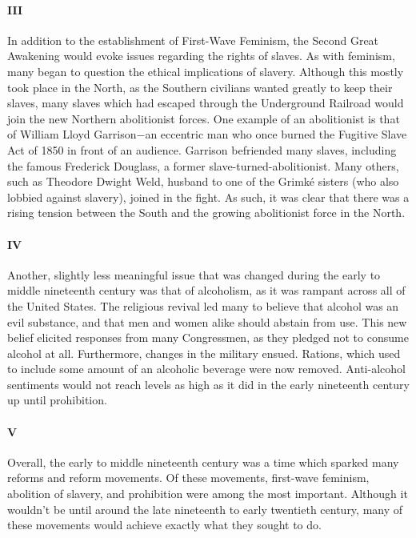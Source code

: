 \documentclass[12pt]{article}
\begin{document}
    \paragraph{III} In addition to the establishment of First-Wave Feminism, the Second Great Awakening would evoke issues regarding the rights of slaves. As with feminism, many began to question the ethical implications of slavery. Although this mostly took place in the North, as the Southern civilians wanted greatly to keep their slaves, many slaves which had escaped through the Underground Railroad would join the new Northern abolitionist forces. One example of an abolitionist is that of William Lloyd Garrison$-$an eccentric man who once burned the Fugitive Slave Act of 1850 in front of an audience. Garrison befriended many slaves, including the famous Frederick Douglass, a former slave-turned-abolitionist. Many others, such as Theodore Dwight Weld, husband to one of the Grimk\'e sisters (who also lobbied against slavery), joined in the fight. As such, it was clear that there was a rising tension between the South and the growing abolitionist force in the North.

    \paragraph{IV} Another, slightly less meaningful issue that was changed during the early to middle nineteenth century was that of alcoholism, as it was rampant across all of the United States. The religious revival led many to believe that alcohol was an evil substance, and that men and women alike should abstain from use. This new belief elicited responses from many Congressmen, as they pledged not to consume alcohol at all. Furthermore, changes in the military ensued. Rations, which used to include some amount of an alcoholic beverage were now removed. Anti-alcohol sentiments would not reach levels as high as it did in the early nineteenth century up until prohibition.

    \paragraph{V} Overall, the early to middle nineteenth century was a time which sparked many reforms and reform movements. Of these movements, first-wave feminism, abolition of slavery, and prohibition were among the most important. Although it wouldn't be until around the late nineteenth to early twentieth century, many of these movements would achieve exactly what they sought to do.
\end{document}
